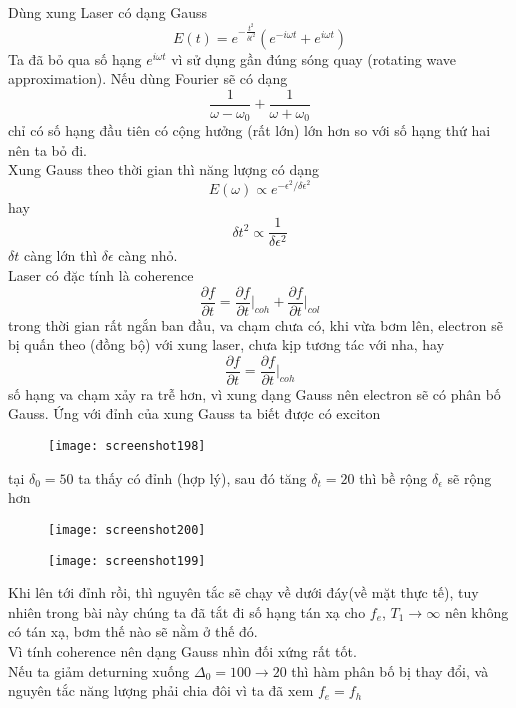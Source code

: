 \documentclass[16Pt]{article}
\begin{document}
	Dùng xung Laser có dạng Gauss
	\[
	E(t) = e^{-\frac{t^2}{\delta t ^2}} \left(e^{-i\omega t} + e^{i\omega t}\right)
	\]
	Ta đã bỏ qua số hạng $e^{i\omega t}$ vì sử dụng gần đúng sóng quay (rotating wave approximation). Nếu dùng Fourier sẽ có dạng
	\[
	\frac{1}{\omega - \omega_0} + \frac{1}{\omega + \omega_0}
	\]
	chỉ có số hạng đầu tiên có cộng hưởng (rất lớn) lớn hơn so với số hạng thứ hai nên ta bỏ đi. \\
	\noindent Xung Gauss theo thời gian thì năng lượng có dạng
	\[
	E(\omega) \propto e^{-\epsilon^2/ \delta \epsilon^2}
	\]
	hay 
	\[
	\delta t^2 \propto \frac{1}{\delta \epsilon^2}
	\]
	$\delta t$ càng lớn thì  $\delta \epsilon$ càng nhỏ.\\
	Laser có đặc tính là coherence
	\[
	\frac{\partial f}{\partial t} = \frac{\partial f}{\partial t} \Bigg|_{coh} +\frac{\partial f}{\partial t} \Bigg|_{col} 
	\]
	trong thời gian rất ngắn ban đầu, va chạm chưa có, khi vừa bơm lên, electron sẽ bị quấn theo (đồng bộ) với xung laser, chưa kịp tương tác với nha, hay 
	\[
	\frac{\partial f}{\partial t} = \frac{\partial f}{\partial t} \Bigg|_{coh}
	\]
	số hạng va chạm xảy ra trễ hơn, vì xung dạng Gauss nên electron sẽ có phân bố Gauss. Ứng với đỉnh của xung Gauss ta biết được có exciton
	\begin{figure}[h!]
		\centering
		\texttt{[image: screenshot198]}
	\end{figure}
	
	tại $\delta_0 = 50$ ta thấy có đỉnh (hợp lý), sau đó tăng $\delta_t = 20$ thì bề rộng $\delta_\epsilon$ sẽ rộng hơn
	\begin{figure}[h!]
		\centering
		\texttt{[image: screenshot200]}
	\end{figure}
	\newpage
	\begin{figure}[h!]
		\centering
		\texttt{[image: screenshot199]}
	\end{figure}
	Khi lên tới đỉnh rồi, thì nguyên tắc sẽ chạy về dưới đáy(về mặt thực tế), tuy nhiên trong bài này chúng ta đã tắt đi số hạng tán xạ cho $f_e$, $T_1 \rightarrow \infty$ nên không có tán xạ, bơm thế nào sẽ nằm ở thế đó.\\
	
	Vì tính coherence nên dạng Gauss nhìn đối xứng rất tốt.\\
	
	Nếu ta giảm deturning xuống $\Delta_0 = 100 \rightarrow 20$ thì hàm phân bố bị thay đổi, và nguyên tắc năng lượng phải chia đôi vì ta đã xem $f_e = f_h$
	
\end{document}
